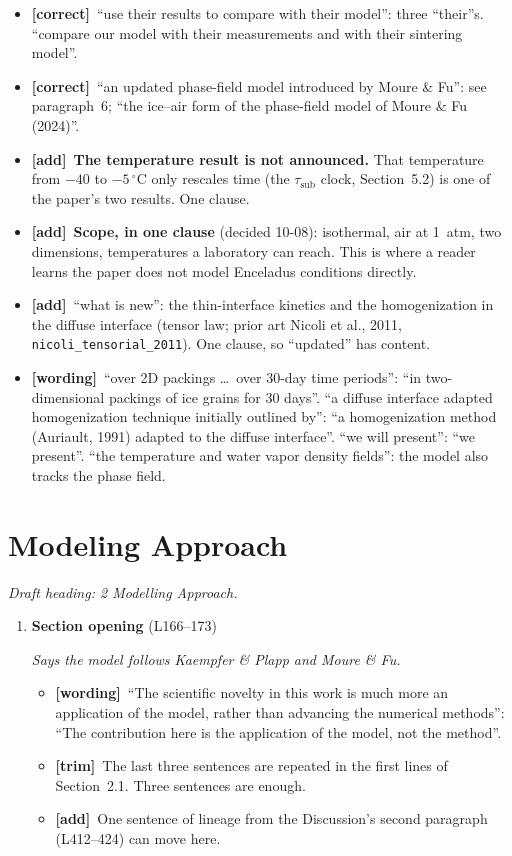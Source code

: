 \documentclass[11pt]{article}
\newcommand{\Pg}[3]{\item \textbf{#1} {\small(#2)}\par\textit{#3}}
\newcommand{\tC}{\textcolor{miss}{\textbf{[correct]}}\ }
\newcommand{\tG}{\textcolor{stale}{\textbf{[wording]}}\ }
\newcommand{\tT}{\textcolor{cut}{\textbf{[trim]}}\ }
\newcommand{\tA}{\textcolor{have}{\textbf{[add]}}\ }
\begin{document}
\begin{enumerate}
\begin{itemize}
    the second part. Also ``SSA \ldots\ is independent'': it is the relation
    between conductivity and SSA that is independent of temperature, not
    SSA.
  \item \tC ``use their results to compare with their model'': three
    ``their''s. ``compare our model with their measurements and with their
    sintering model''.
  \item \tC ``an updated phase-field model introduced by Moure \& Fu'':
    see paragraph~6; ``the ice--air form of the phase-field model of Moure
    \& Fu (2024)''.
  \item \tA \textbf{The temperature result is not announced.} That
    temperature from $-40$ to $-5\,^{\circ}$C only rescales time (the
    $\tau_{\mathrm{sub}}$ clock, Section~5.2) is one of the paper's two
    results. One clause.
  \item \tA \textbf{Scope, in one clause} (decided 10-08): isothermal, air
    at 1~atm, two dimensions, temperatures a laboratory can reach. This is
    where a reader learns the paper does not model Enceladus conditions
    directly.
  \item \tA ``what is new'': the thin-interface kinetics and the
    homogenization in the diffuse interface (tensor law; prior art Nicoli
    et al., 2011, \texttt{nicoli\_tensorial\_2011}). One clause, so
    ``updated'' has content.
  \item \tG ``over 2D packings \ldots\ over 30-day time periods'': ``in
    two-dimensional packings of ice grains for 30 days''. ``a diffuse
    interface adapted homogenization technique initially outlined by'':
    ``a homogenization method (Auriault, 1991) adapted to the diffuse
    interface''. ``we will present'': ``we present''. ``the temperature and
    water vapor density fields'': the model also tracks the phase field.
  \end{itemize}
\end{enumerate}

\section{Modeling Approach}
\textit{Draft heading: 2 Modelling Approach.}
\begin{enumerate}
\Pg{Section opening}{L166--173}{Says the model follows Kaempfer \& Plapp and Moure \& Fu.}
  \begin{itemize}
  \item \tG ``The scientific novelty in this work is much more an application
    of the model, rather than advancing the numerical methods'': ``The
    contribution here is the application of the model, not the method''.
  \item \tT The last three sentences are repeated in the first lines of
    Section~2.1. Three sentences are enough.
  \item \tA One sentence of lineage from the Discussion's second paragraph
    (L412--424) can move here.
  \end{itemize}
\end{enumerate}
\end{document}
